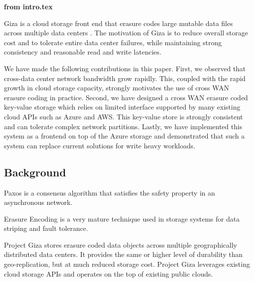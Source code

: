 {\bf from intro.tex}

Giza is a cloud storage front end that erasure codes large mutable data files across multiple data centers . The motivation of Giza is to reduce overall storage cost and to tolerate entire data center failures, while maintaining strong consistency and reasonable read and write latencies.

\par
We have made the following contributions in this paper. First, we observed that cross-data center network bandwidth grow rapidly. This, coupled with the rapid growth in cloud storage capacity, strongly motivates the use of cross WAN erasure coding in practice. Second, we have designed a cross WAN erasure coded key-value storage which relies on limited interface supported by many existing cloud APIs such as Azure and AWS. This key-value store is strongly consistent and can tolerate complex network partitions. Lastly, we have implemented this system as a frontend on top of the Azure storage and demonstrated that such a system can replace current solutions for write heavy workloads.

\subsection{Background}
Paxos is a consensus algorithm that satisfies the safety property in an asynchronous network. 
\par
Erasure Encoding is a very mature technique used in storage systems for data striping and fault tolerance.

Project Giza stores erasure coded data objects across multiple geographically distributed data centers. It provides the same or higher level of durability than geo-replication, but at much reduced storage cost. Project Giza leverages existing cloud storage APIs and operates on the top of existing public clouds.

